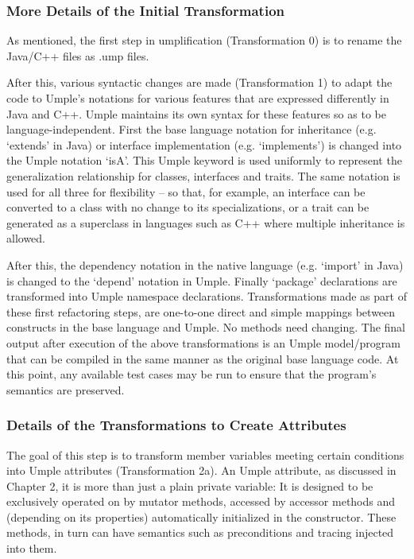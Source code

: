 \subsubsection{More Details of the Initial Transformation}

As mentioned, the first step in umplification (Transformation 0) is to rename the Java/C++ files as .ump files.

After this, various syntactic changes are made (Transformation 1) to adapt the code to Umple's notations for various features that are expressed differently in Java and C++. Umple maintains its own syntax for these features so as to be language-independent.
First the base language notation for inheritance (e.g. `extends' in Java) or interface implementation (e.g. `implements') is changed into the Umple notation `isA'. This Umple keyword is used uniformly to represent the generalization relationship for classes, interfaces and traits. The same notation is used for all three for flexibility -- so that, for example, an interface can be converted to a class with no change to its specializations, or a trait can be generated as a superclass in languages such as C++ where multiple inheritance is allowed.

After this, the dependency notation in the native language (e.g. `import' in Java) is changed to the `depend' notation in Umple. Finally `package' declarations are transformed into Umple namespace declarations. 
Transformations made as part of these first refactoring steps, are one-to-one direct and simple mappings between constructs in the base language and Umple. No methods need changing. The final output after execution of the above transformations is an Umple model/program that can be compiled in the same manner as the original base language code.
At this point, any available test cases may be run to ensure that the program's semantics are preserved.
\subsubsection{Details of the Transformations to Create Attributes}

The goal of this step is to transform member variables meeting certain conditions into Umple attributes (Transformation 2a). An Umple attribute, as discussed in Chapter 2, it is more than just a plain private variable: It is designed to be exclusively operated on by mutator methods, accessed by accessor methods and (depending on its properties) automatically initialized in the constructor. These methods, in turn can have semantics such as preconditions and tracing injected into them. 

